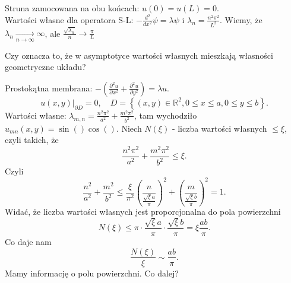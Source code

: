 \documentclass[../main.tex]{subfiles}
\begin{document}
		\begin{przyklad}
				Struna zamocowana na obu końcach: $u(0) = u(L) = 0$.\\
				Wartości własne dla operatora S-L: $-\frac{d^2}{dx^2}\psi = \lambda\psi$ i $\lambda_n = \frac{n^2\pi^2}{L^2}$. Wiemy, że $\lambda_n \underset{n\to\infty}{\to} \infty$, ale $\frac{\sqrt{\lambda_n} }{n} \to \frac{\pi}{L}$
		\end{przyklad}
		Czy oznacza to, że w asymptotyce wartości własnych mieszkają własności geometryczne układu?
		\begin{przyklad}
				Prostokątna membrana: $-\left( \frac{\partial ^2u}{\partial x^2} + \frac{\partial^2 u}{\partial y^2}  \right) = \lambda u$.
				\[
						\left.u(x,y)\right|_{\partial D} = 0,\quad D = \left\{ (x,y)\in \mathbb{R}^2, 0 \le x \le a, 0 \le y \le b \right\}
				.\]
				Wartości własne: $\lambda_{m,n} = \frac{n^2\pi^2}{a^2} + \frac{m^2\pi^2}{b^2}$, tam wychodziło $u_{mn}(x,y) = \sin\left(  \right)\cos\left(  \right)  $. Niech $N(\xi)$ - liczba wartości własnych $ \le \xi$, czyli takich, że
				\[
						\frac{n^2\pi^2}{a^2} + \frac{m^2\pi^2}{b^2} \le \xi
				.\]
				Czyli
\[
		\frac{n^2}{a^2} + \frac{m^2}{b^2} \le \frac{\xi}{\pi^2} \left(\frac{n}{\frac{\sqrt{\xi} a}{\pi}}\right)^2 + \left( \frac{m}{\frac{\sqrt{\xi} b}{\pi}} \right) ^2 = 1
.\]
Widać, że liczba wartości własnych jest proporcjonalna do pola powierzchni
\[
		N(\xi) \le \pi \cdot \frac{\sqrt{\xi}a }{\pi} \cdot \frac{\sqrt{\xi} b}{\pi} = \xi \frac{ab}{\pi}
.\]
Co daje nam
\[
		\frac{N(\xi)}{\xi} \sim \frac{ab}{\pi}
.\]
Mamy informację o polu powierzchni. Co dalej?
		\end{przyklad}
\end{document}
